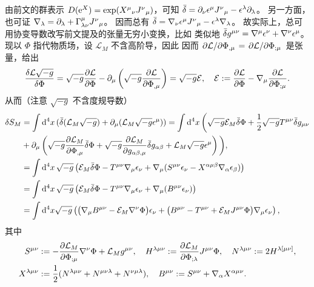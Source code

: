 
由前文的群表示 $D(\mathrm{e}^X) = \exp(X^\mu{}_\nu J^\nu{}_\mu)$，可知 $\bar\delta = \partial_\nu\epsilon^\mu J^\nu{}_\mu - \epsilon^\lambda\partial_\lambda$。
另一方面，也可证 $\nabla_\lambda = \partial_\lambda +\Gamma^\mu_{\lambda\nu}J^\nu{}_\mu$。
因而总有 $\bar\delta = \nabla_\nu\epsilon^\mu J^\nu{}_\mu - \epsilon^\lambda\nabla_\lambda$。
故实际上，总可用协变导数改写前文提及的张量无穷小变换，比如 
类似地 $\bar\var g^{\mu\nu} = \nabla^\mu \epsilon^\nu + \nabla^\nu \epsilon^\mu$。现以 $\Phi$ 指代物质场，设 $\mathcal L_M$ 不含高阶导，因此
因而 $\pdv*{\mathcal{L}}{\Phi_{,\mu}}=\pdv*{\mathcal{L}}{\Phi_{;\mu}}$ 是张量，给出
\[
    \fdv{\Lag\sqrt{-g}}{\Phi}=\sqrt{-g}\pdv{\Lag}{\Phi}-\p_\mu\left(\sqrt{-g}\pdv{\Lag}{\Phi_{,\mu}}\right) = \sqrt{-g}\mathcal E,\quad \mathcal E:=\pdv{\Lag}{\Phi}-\cd_\mu\pdv{\Lag}{\Phi_{;\mu}}.
\]
从而（注意 $\sqrt{-g}$ 不含度规导数）
\begin{align*}
    \delta S_M &=\int \dd[4]{x} (\bar\var(\mathcal{L}_M\sqrt{-g})+\partial_\mu(\mathcal{L}_M\sqrt{-g}\epsilon^\mu))=\int\dd[4]{x}\bigg(\sqrt{-g}\mathcal E_M\bar\var\Phi + \frac12\sqrt{-g}T^{\mu\nu}\bar\var g_{\mu\nu} \\
    &+ \partial_\mu\left(\sqrt{-g}\pdv{\mathcal{L}_M}{\Phi_{,\mu}}\bar\var\Phi+\sqrt{-g}\pdv{\mathcal{L}_M}{g_{\alpha\beta,\mu}}\bar\var g_{\alpha\beta}+\mathcal{L}_M\sqrt{-g}\epsilon^\mu\right)\bigg),\\
    &= \int\dd[4]{x}\sqrt{-g}\left(\mathcal E_M\bar\var\Phi - T^{\mu\nu}\nabla_\mu\epsilon_\nu + \nabla_\mu (S^{\mu\nu}\epsilon_\nu - X^{\alpha\mu\beta}\nabla_\alpha\epsilon_\beta )\right)\\
    &= \int\dd[4]{x}\sqrt{-g}\left(\mathcal E_M\bar\var\Phi - T^{\mu\nu}\nabla_\mu\epsilon_\nu + \nabla_\mu(B^{\mu\nu}\epsilon_\nu) \right)\\
    &=\int \dd[4]x\sqrt{-g}\left( \big(\nabla_\mu B^{\mu\nu} -\mathcal E_M\nabla^\nu\Phi\big)\epsilon_\nu  + \big( B^{\mu\nu}-T^{\mu\nu} +\mathcal E_M J^{\mu\nu}\Phi \big) \nabla_\mu\epsilon_\nu \right),
\end{align*}
其中
\begin{align*}
    S^{\mu\nu} &:= - \pdv{\mathcal{L}_M}{\Phi_{;\mu}} \nabla^\nu\Phi + \mathcal{L}_M g^{\mu\nu} ,\quad H^{\lambda\mu\nu}:= \pdv{\mathcal{L}_M}{\Phi_{;\lambda}} J^{\mu\nu}\Phi,\quad N^{\lambda\mu\nu} := 2H^{\lambda[\mu\nu]}, \\ X^{\lambda\mu\nu} &:= \frac 12 (N^{\lambda\mu\nu} + N^{\mu\nu\lambda} + N^{\nu\mu\lambda}),\quad B^{\mu\nu} := S^{\mu\nu} + \nabla_\alpha X^{\alpha\mu\nu}.
\end{align*}
